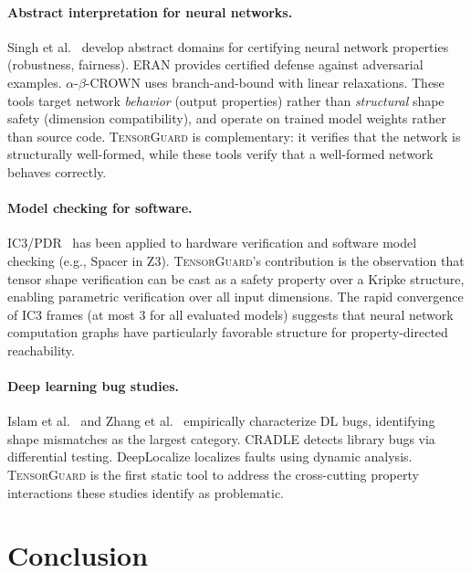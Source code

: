 \documentclass[10pt]{article}
\newcommand{\tguard}{\textsc{TensorGuard}}
\theoremstyle{plain}
\theoremstyle{definition}
\theoremstyle{remark}
\begin{document}
\paragraph{Abstract interpretation for neural networks.}
Singh et al.~\cite{singh19} develop abstract domains for certifying
neural network properties (robustness, fairness).  ERAN provides
certified defense against adversarial examples.
$\alpha$-$\beta$-CROWN uses branch-and-bound with linear relaxations.
These tools target network \emph{behavior} (output properties)
rather than \emph{structural} shape safety (dimension compatibility),
and operate on trained model weights rather than source code.
\tguard{} is complementary: it verifies that the network is
structurally well-formed, while these tools verify that a well-formed
network behaves correctly.

\paragraph{Model checking for software.}
IC3/PDR~\cite{bradley11,een11} has been applied to hardware
verification and software model checking (e.g., Spacer in Z3).
\tguard{}'s contribution is the observation that tensor shape
verification can be cast as a safety property over a Kripke
structure, enabling parametric verification over all input
dimensions.  The rapid convergence of IC3 frames (at most 3 for
all evaluated models) suggests that neural network computation
graphs have particularly favorable structure for property-directed
reachability.

\paragraph{Deep learning bug studies.}
Islam et al.~\cite{islam19} and Zhang et al.~\cite{zhang18}
empirically characterize DL bugs, identifying shape mismatches as
the largest category.  CRADLE detects library bugs via differential
testing.  DeepLocalize localizes faults using dynamic analysis.
\tguard{} is the first static tool to address the cross-cutting
property interactions these studies identify as problematic.


\section{Conclusion}\label{sec:conclusion}
\end{document}
